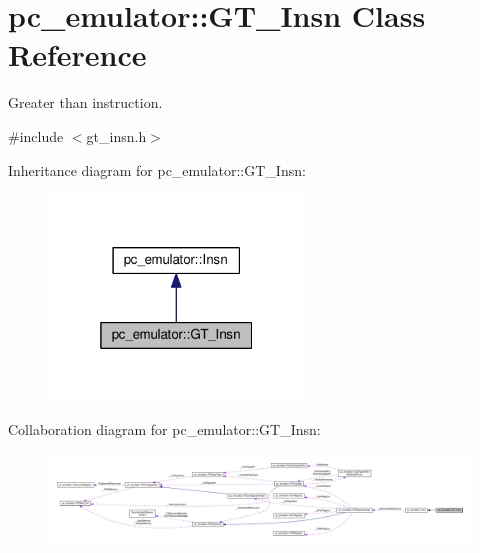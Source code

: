 \hypertarget{classpc__emulator_1_1GT__Insn}{}\section{pc\+\_\+emulator\+:\+:G\+T\+\_\+\+Insn Class Reference}
\label{classpc__emulator_1_1GT__Insn}


Greater than instruction.  




{\ttfamily \#include $<$gt\+\_\+insn.\+h$>$}



Inheritance diagram for pc\+\_\+emulator\+:\+:G\+T\+\_\+\+Insn\+:\nopagebreak
\begin{figure}[H]
\begin{center}
\leavevmode
\includegraphics[width=193pt]{classpc__emulator_1_1GT__Insn__inherit__graph}
\end{center}
\end{figure}


Collaboration diagram for pc\+\_\+emulator\+:\+:G\+T\+\_\+\+Insn\+:\nopagebreak
\begin{figure}[H]
\begin{center}
\leavevmode
\includegraphics[width=350pt]{classpc__emulator_1_1GT__Insn__coll__graph}
\end{center}
\end{figure}
